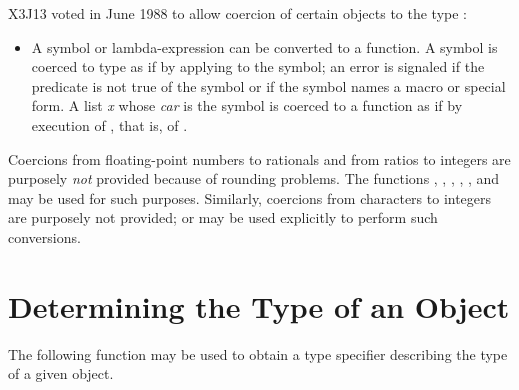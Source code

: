 \begin{defun}[Function]
\begin{itemize}
\end{itemize}

\begin{newer}
X3J13 voted in June 1988 
to allow coercion of certain objects to the type :
\begin{itemize}
\item
A symbol or lambda-expression can be converted to a function.
A symbol is coerced to type  as if by applying
 to the symbol; an error is signaled if the predicate
 is not true of
the symbol or if the symbol names a macro or special form.
A list \emph{x} whose \emph{car} is the symbol 
is coerced to a function as if by execution of ,
that is, of .
\end{itemize}
\end{newer}

Coercions from floating-point numbers to rationals and from ratios
to integers are purposely \emph{not} provided because of rounding
problems.  The functions , ,
, , , and  may be used for
such purposes.  Similarly, coercions from characters to integers
are purposely not provided;  or  may be
used explicitly to perform such conversions.
\end{defun}

\section{Determining the Type of an Object}

The following function may be used to obtain a type specifier
describing the type of a given object.

